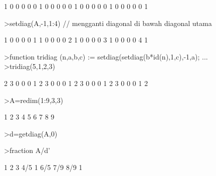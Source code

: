 \documentclass[a4paper,11pt,oneside,enabledeprecatedfontcommands]{scrbook}
\newenvironment{eulernotebook}{}{}
\begin{document}
\begin{eulernotebook}
\begin{euleroutput}
            1             0             0             0             0 
            0             1             0             0             0 
            0             0             1             0             0 
            0             0             0             1             0 
            0             0             0             0             1 
\end{euleroutput}
\begin{eulerprompt}
>setdiag(A,-1,1:4) // mengganti diagonal di bawah diagonal utama
\end{eulerprompt}
\begin{euleroutput}
            1             0             0             0             0 
            1             1             0             0             0 
            0             2             1             0             0 
            0             0             3             1             0 
            0             0             0             4             1 
\end{euleroutput}
\begin{eulerprompt}
>function tridiag (n,a,b,c) := setdiag(setdiag(b*id(n),1,c),-1,a); ...
>tridiag(5,1,2,3)
\end{eulerprompt}
\begin{euleroutput}
            2             3             0             0             0 
            1             2             3             0             0 
            0             1             2             3             0 
            0             0             1             2             3 
            0             0             0             1             2 
\end{euleroutput}
\begin{eulerprompt}
>A=redim(1:9,3,3)
\end{eulerprompt}
\begin{euleroutput}
            1             2             3 
            4             5             6 
            7             8             9 
\end{euleroutput}
\begin{eulerprompt}
>d=getdiag(A,0)
\end{eulerprompt}
\begin{euleroutput}
[1,  5,  9]
\end{euleroutput}
\begin{eulerprompt}
>fraction A/d'
\end{eulerprompt}
\begin{euleroutput}
        1         2         3 
      4/5         1       6/5 
      7/9       8/9         1 
\end{euleroutput}


\end{eulernotebook}
\end{document}
